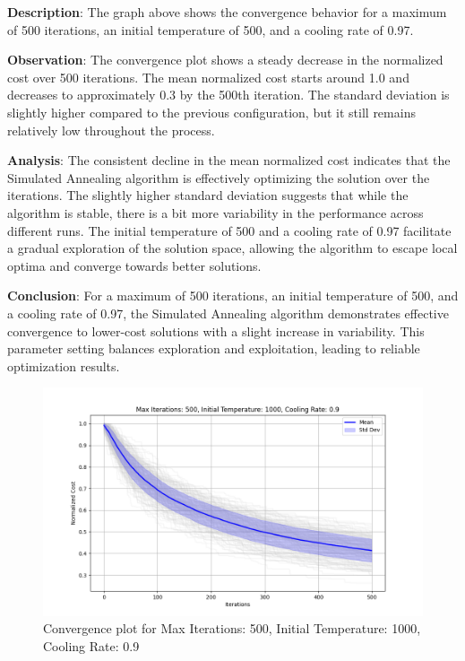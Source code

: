 \documentclass[
]{article}
\begin{document}
    \textbf{Description}: The graph above shows the convergence behavior for a maximum of 500 iterations, an initial temperature of 500, and a cooling rate of 0.97.

    \textbf{Observation}: The convergence plot shows a steady decrease in the normalized cost over 500 iterations. The mean normalized cost starts around 1.0 and decreases to approximately 0.3 by the 500th iteration. The standard deviation is slightly higher compared to the previous configuration, but it still remains relatively low throughout the process.

    \textbf{Analysis}: The consistent decline in the mean normalized cost indicates that the Simulated Annealing algorithm is effectively optimizing the solution over the iterations. The slightly higher standard deviation suggests that while the algorithm is stable, there is a bit more variability in the performance across different runs. The initial temperature of 500 and a cooling rate of 0.97 facilitate a gradual exploration of the solution space, allowing the algorithm to escape local optima and converge towards better solutions.

    \textbf{Conclusion}: For a maximum of 500 iterations, an initial temperature of 500, and a cooling rate of 0.97, the Simulated Annealing algorithm demonstrates effective convergence to lower-cost solutions with a slight increase in variability. This parameter setting balances exploration and exploitation, leading to reliable optimization results.

    \begin{figure}[H]
        \centering
        \includegraphics[width=\textwidth]{simulated_annealing/max_iter_500_init_temp_1000_cooling_rate_0.9}
        \caption{Convergence plot for Max Iterations: 500, Initial Temperature: 1000, Cooling Rate: 0.9}
        \label{fig:sa_500_1000_0.9}
    \end{figure}
\end{document}
